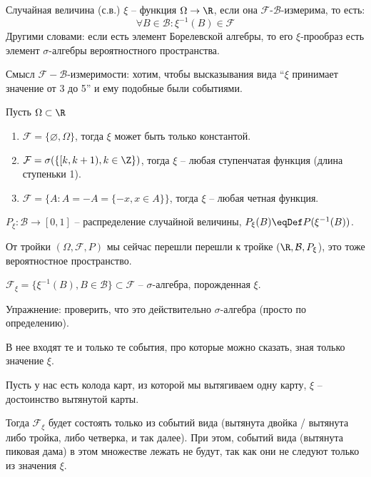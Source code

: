 \begin{Def}
Случайная величина (с.в.) $\xi$ -- функция $\Omega \to \R$, если она $\mathcal{F}$-$\mathcal{B}$-измерима, 
то есть:
\[ \forall B \in \mathcal{B} \colon \xi^{-1}(B) \in \mathcal{F} \]
Другими словами: если есть элемент Борелевской алгебры, то его $\xi$-прообраз есть элемент $\sigma$-алгебры вероятностного пространства.
\end{Def}
\begin{Rem}
Смысл $\mathcal{F}-\mathcal{B}$-измеримости: хотим, чтобы высказывания вида ``$\xi$ принимает значение от 3 до 5'' и ему подобные были событиями.
\end{Rem}
\begin{exmp}
Пусть $\Omega \subset \R$
\begin{enumerate}
\item $\mathcal{F} = \{\varnothing, \Omega\}$, тогда $\xi$ может быть только константой.
\item $\mathcal{F} = \sigma(\{[k, k + 1), k \in \Z\})$, тогда $\xi$ -- любая ступенчатая функция (длина ступеньки 1).
\item $\mathcal{F} = \{A\colon A = -A = \{-x, x \in A\}\}$, тогда $\xi$ -- любая четная функция.
\end{enumerate}
\end{exmp}

\begin{Def}
$P_{\xi}\colon \mathcal{B} \to [0, 1]$ -- распределение случайной величины, $P_{\xi}(B) \eqDef P(\xi^{-1}(B))$.
\end{Def}

От тройки $(\Omega, \mathcal{F}, P)$ мы сейчас перешли перешли к тройке $(\R, \mathcal{B}, P_{\xi}$), это тоже вероятностное пространство.

\begin{Def}
$\mathcal{F}_{\xi} = \{ \xi^{-1}(B), B \in \mathcal{B} \} \subset \mathcal{F}$ -- $\sigma$-алгебра, порожденная $\xi$. 
\end{Def}
Упражнение: проверить, что это действительно $\sigma$-алгебра (просто по определению).
\begin{Rem}
В нее входят те и только те события, про которые можно сказать, зная только значение $\xi$.
\end{Rem}
\begin{exmp}
Пусть у нас есть колода карт, из которой мы вытягиваем одну карту, $\xi$ -- достоинство вытянутой карты.

Тогда $\mathcal{F}_{\xi}$ будет состоять только из событий вида (вытянута двойка / вытянута либо тройка, либо четверка, и так далее).
При этом, событий вида (вытянута пиковая дама) в этом множестве лежать не будут, так как они не следуют только из значения $\xi$.
\end{exmp}

